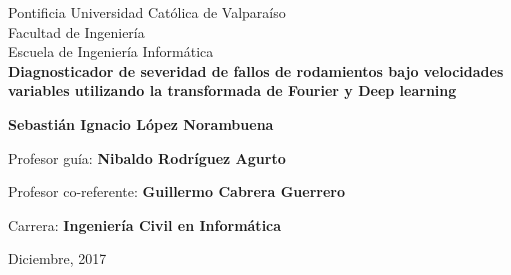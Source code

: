 \documentclass[a4paper,12pt]{article}
\begin{document}
\thispagestyle{empty}

\begin{center}
\large{Pontificia Universidad Católica de Valparaíso\\
Facultad de Ingeniería\\
Escuela de Ingeniería Informática}\\

\vspace{4cm}
\Large{\textbf{Diagnosticador de severidad de fallos de rodamientos bajo velocidades variables utilizando la transformada de Fourier y Deep learning}}
\vspace{3cm}

\textbf{Sebastián Ignacio López Norambuena}\\
\end{center}

\vspace{1cm}
\begin{center} 
Profesor guía: \textbf{Nibaldo Rodríguez Agurto}
\end{center}
\begin{center} 
Profesor co-referente: \textbf{Guillermo Cabrera Guerrero}
\end{center}
\vspace{1cm}

\begin{center} 
Carrera: \textbf{Ingeniería Civil en Informática}
\end{center}

\vspace{3cm}

\begin{center} 
Diciembre, 2017
\end{center}
\newpage


\newpage

\end{document}

